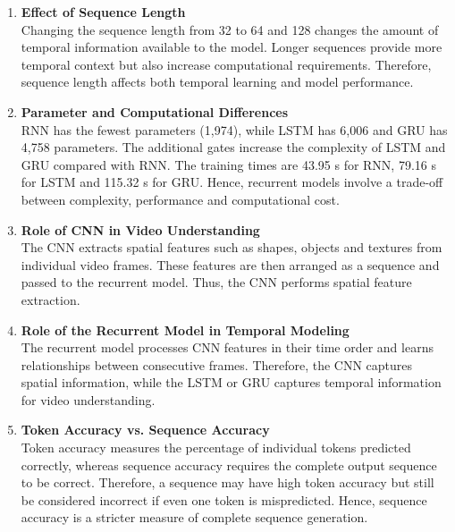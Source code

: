 \documentclass[10pt]{article}
\begin{document}
\begin{enumerate}
\item \textbf{Effect of Sequence Length}\\
Changing the sequence length from 32 to 64 and 128 changes the amount of temporal information available to the model. Longer sequences provide more temporal context but also increase computational requirements. Therefore, sequence length affects both temporal learning and model performance.

\item \textbf{Parameter and Computational Differences}\\
RNN has the fewest parameters (1,974), while LSTM has 6,006 and GRU has 4,758 parameters. The additional gates increase the complexity of LSTM and GRU compared with RNN. The training times are 43.95 s for RNN, 79.16 s for LSTM and 115.32 s for GRU. Hence, recurrent models involve a trade-off between complexity, performance and computational cost.

\item \textbf{Role of CNN in Video Understanding}\\
The CNN extracts spatial features such as shapes, objects and textures from individual video frames. These features are then arranged as a sequence and passed to the recurrent model. Thus, the CNN performs spatial feature extraction.

\item \textbf{Role of the Recurrent Model in Temporal Modeling}\\
The recurrent model processes CNN features in their time order and learns relationships between consecutive frames. Therefore, the CNN captures spatial information, while the LSTM or GRU captures temporal information for video understanding.

\item \textbf{Token Accuracy vs. Sequence Accuracy}\\
Token accuracy measures the percentage of individual tokens predicted correctly, whereas sequence accuracy requires the complete output sequence to be correct. Therefore, a sequence may have high token accuracy but still be considered incorrect if even one token is mispredicted. Hence, sequence accuracy is a stricter measure of complete sequence generation.

\end{enumerate}

\end{document}
